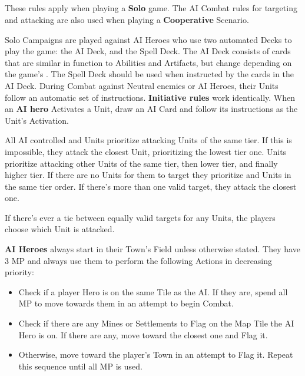 \begin{multicols}{2}
\subsection*{}
These rules apply when playing a \textbf{Solo} game.
The AI Combat rules for targeting and attacking are also used when playing a \textbf{Cooperative} Scenario.\par
Solo Campaigns are played against AI Heroes who use two automated Decks to play the game: the AI Deck, and the Spell Deck.
The AI Deck consists of cards that are similar in function to Abilities and Artifacts, but change depending on the game's .
The Spell Deck should be used when instructed by the cards in the AI Deck.
During Combat against Neutral enemies or AI Heroes, their Units follow an automatic set of instructions.
\textbf{Initiative rules} work identically.
When an \textbf{AI hero} Activates a Unit, draw an AI Card and follow its instructions as the Unit's Activation.\par
All AI controlled  and  Units prioritize attacking Units of the same tier.
If this is impossible, they attack the closest Unit, prioritizing the lowest tier one.
 Units prioritize attacking other  Units of the same tier, then lower tier, and finally higher tier.
If there are no  Units for them to target they prioritize  and  Units in the same tier order.
If there's more than one valid target, they attack the closest one.\par
If there's ever a tie between equally valid targets for any Units, the players choose which Unit is attacked.

\textbf{AI Heroes} always start in their Town's Field unless otherwise stated.
They have 3 MP and always use them to perform the following Actions in decreasing priority:
\begin{itemize}
  \item Check if a player Hero is on the same Tile as the AI.
    If they are, spend all MP to move towards them in an attempt to begin Combat.
  \item Check if there are any Mines or Settlements to Flag on the Map Tile the AI Hero is on.
    If there are any, move toward the closest one and Flag it.
  \item Otherwise, move toward the player's Town in an attempt to Flag it.
Repeat this sequence until all MP is used.
\end{itemize}


\end{multicols}
